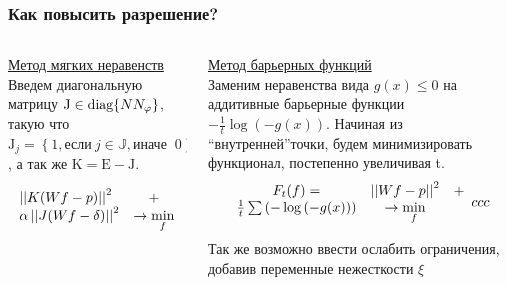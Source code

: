 \documentclass[12pt]{beamer}
\begin{document}
\begingroup
\small
\begin{frame}
  \frametitle{Как повысить разрешение?}
  \begin{columns}[T, onlytextwidth]
  \hspace{-0.5cm}
  \begin{column}{0.5\textwidth}
    \underline{Метод мягких неравенств} \\ \vspace{0.5cm}
    Введем диагональную матрицу $\mathrm J \in \textup{diag}\{N N_\varphi\}$, такую что 
    $\mathrm J_{j} = \left\{1, \mbox{если}\ j \in \mathbb J, \mbox{иначе }\ 0\right\}$, а так же $\mathrm K = \mathrm E - \mathrm J$.


    \begin{equation} \notag
      \label{eq:soft-ineq}
      \begin{array}{lc}
      \left|\left| K(Wf - p) \right|\right|^2 & + \\
      \alpha \left|\left| J(Wf - \delta) \right|\right|^2  & \to \min\limits_f
      \end{array}
    \end{equation}
  \end{column}

  \begin{column}{0.5\textwidth}
    \underline{Метод барьерных функций} \\ \vspace{0.5cm}
    Заменим неравенства вида $g(x) \leq 0$ на аддитивные барьерные функции $-\frac 1 t \log{\left(-g(x)\right)}$.
    Начиная из ``внутренней''точки, будем минимизировать функционал, постепенно увеличивая t.
    $$
    \begin{array}{ccc}
      F_t(f) = & \left|\left| Wf - p \right|\right|^2 & + \\
     \frac 1 t \sum \left( -\log{\left(-g(x)\right)} \right) &\to \min\limits_f &
    \end{array}{ccc}
    $$

    Так же возможно ввести ослабить ограничения, добавив переменные нежесткости $\xi$

  \end{column}
  \end{columns}
\end{frame}
\endgroup
\end{document}
